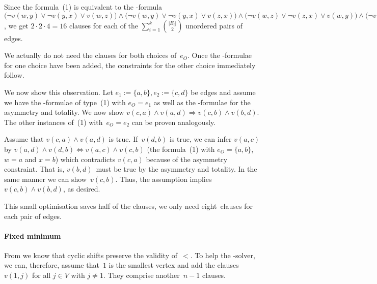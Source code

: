 Since the formula~(1) is equivalent to the \CNF-formula $\bigl(\lnot v(w, y) \lor \lnot v(y, x) \lor v(w, z)\bigr) \land\allowbreak\bigl(\lnot v(w, y) \lor \lnot v(y, x) \lor v(z, x)\bigr) \land \bigl(\lnot v(w, z) \lor \lnot v(z, x) \lor v(w, y)\bigr) \land \bigl(\lnot v(w, z) \lor \lnot v(z, x) \lor v(y, x)\bigr)$, we get $\text{2}\cdot \text{2} \cdot \text{4} = \text{16}$ clauses for each of
the $\sum_{i=1}^{k} \binom{|E_i|}{2}$ unordered pairs of edges.

We actually do not need the clauses for both choices of~$e_O$. Once the \SAT-formulae for one choice have been added, the constraints for the other choice immediately follow.

We now show this observation. Let $e_1 := \{a, b\}, e_2 := \{c, d\}$ be edges and
assume we have the \SAT-formulae of type~(1) with $e_O = e_1$ as well as the \SAT-formulae for the asymmetry and totality. 
We now show $v(c, a) \land v(a, d) \Rightarrow v(c, b) \land v(b, d)$. The other
instances of~(1) with~$e_O = e_2$ can be proven analogously. 

Assume that $v(c, a) \land v(a, d)$ is true.
If~$v(d, b)$ is true, we can infer $v(a, c)$ by $v(a, d) \land v(d, b) \Leftrightarrow
v(a, c) \land v(c, b)$ (the formula~(1) with $e_O = \{a, b\}$, $w = a$ and $x = b$) which contradicts $v(c, a)$ because of the asymmetry constraint. 
That is, $v(b, d)$~must be true by the asymmetry and totality.
In the
same manner we can show~$v(c, b)$. Thus, the assumption implies $v(c, b) \land v(b, d)$,
as desired.

This small optimisation saves half of the clauses,
\ie we only need eight~clauses for each pair of edges.

\paragraph{Fixed minimum}

From  we know that cyclic shifts preserve the validity of~$<$.
To help the \SAT-solver, we can, therefore, assume that~$1$ is the
smallest vertex and add the clauses~$v(1, j)$ for all $j \in V$ with $j \neq 1$. They
comprise another~$n-1$ clauses.

